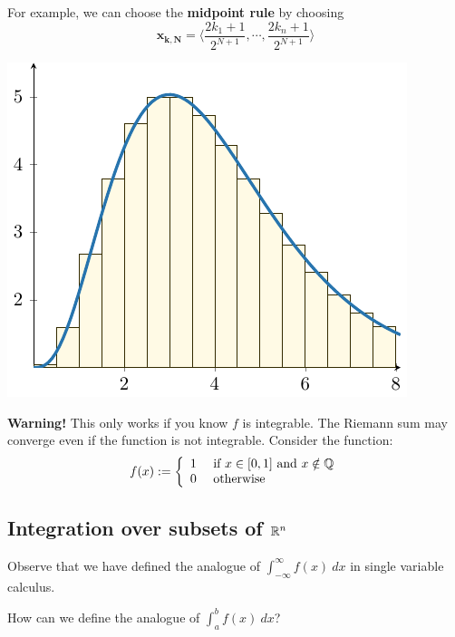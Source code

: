     \begin{example}
        For example, we can choose the \textbf{midpoint rule} by choosing $$\bm{x_{k,N}} = \langle \frac{2k_1 + 1}{2^{N+1}}, \cdots, \frac{2k_n + 1}{2^{N+1}} \rangle $$

        \begin{center}
            \includegraphics{chapters/4-IntegrationRn/figures/figures-riemannmidpoint.pdf}
        \end{center}
    \end{example}

    
    \begin{example}
     \textbf{Warning!} This only works if you know $f$ is integrable.  The Riemann sum may converge even if the function is not integrable.  Consider the function: $$f(x) := \left\{
		\begin{array}{ll}
			1 & \text{ if } x \in [0,1] \text{ and }  x \notin \mathbb{Q} \\
			0 & \text{ otherwise}
		\end{array}
		\right.$$   
    \end{example}


\subsection{Integration over subsets of $\mathbb{R}^n$}

Observe that we have defined the analogue of $\int_{-\infty}^\infty f(x) \ dx$ in single variable calculus.

    \begin{motivating}
        How can we define the analogue of $\int_a^b f(x) \ dx$?  
    \end{motivating}

